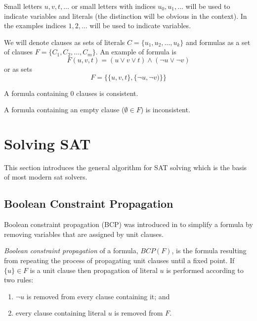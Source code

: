 Small letters $u, v, t, \ldots$ or small letters with indices $u_0,
u_1, \ldots$ will be used to indicate variables and literals (the
distinction will be obvious in the context). In the examples
indices $1, 2, \ldots$ will be used to indicate variables.

We will denote clauses as sets of literals $C = \{ u_1, u_2, \ldots,
u_k \}$ and formulas as a set of clauses $F = \{ C_1, C_2, \ldots,
C_m \} $.  An example of formula is
\[
F(u, v, t) = (u \lor v \lor t) \land (\neg u \lor \neg v)
\]
or as sets
\[
F = \{ \{u, v, t\}, \{\neg u, \neg v)\}\}
\]

\begin{myprop}
  A formula containing 0 clauses is consistent.
\end{myprop}

\begin{myprop}
  A formula containing an empty clause ($\emptyset \in F$) is inconsistent.
\end{myprop}


\section{Solving SAT}
\label{sec:solving-sat}

This section introduces the general algorithm for SAT solving which
is the basis of most modern sat solvers.

\subsection{Boolean Constraint Propagation}
\label{ssec:bcp}

Boolean constraint propagation (BCP) was introduced in
\cite{Davis:1960:CPQ:321033.321034} to simplify a formula by removing
variables that are assigned by unit clauses.

\begin{mydef}
  \emph{Boolean constraint propagation} of a formula, $BCP(F)$, is
  the formula resulting from repeating the process of propagating
  unit clauses until a fixed point. If $\{ u \} \in F$ is a unit
  clause then propagation of literal
  $u$ is performed according to two rules:
  \begin{enumerate}
    \item $\neg u$ is removed from every clause containing it; and
    \item every clause containing literal $u$ is removed from $F$.
  \end{enumerate}
\end{mydef}

